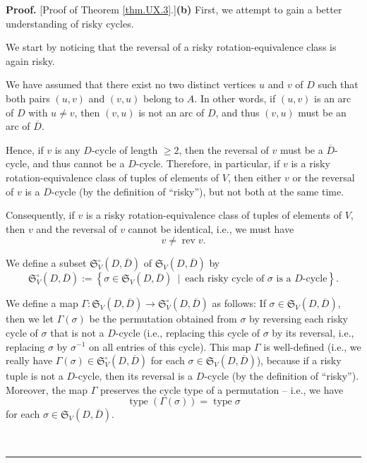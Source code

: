 \documentclass[numbers=enddot,12pt,final,onecolumn,notitlepage]{scrartcl}%
\numberwithin{exer}{section}
\theoremstyle{definition}
\newenvironment{proof}[1][Proof]{\noindent\textbf{#1.} }{\ \rule{0.5em}{0.5em}}
\begin{document}
\begin{proof}
[Proof of Theorem \ref{thm.UX.3}.]\textbf{(b)} First, we attempt to gain a
better understanding of risky cycles.

We start by noticing that the reversal of a risky rotation-equivalence class
is again risky.

We have assumed that there exist no two distinct vertices $u$ and $v$ of $D$
such that both pairs $\left(  u,v\right)  $ and $\left(  v,u\right)  $ belong
to $A$. In other words, if $\left(  u,v\right)  $ is an arc of $D$ with $u\neq
v$, then $\left(  v,u\right)  $ is not an arc of $D$, and thus $\left(
v,u\right)  $ must be an arc of $\overline{D}$.

Hence, if $v$ is any $D$-cycle of length $\geq2$, then the reversal of $v$
must be a $\overline{D}$-cycle, and thus cannot be a $D$-cycle. Therefore, in
particular, if $v$ is a risky rotation-equivalence class of tuples of elements
of $V$, then either $v$ or the reversal of $v$ is a $D$-cycle (by the
definition of \textquotedblleft risky\textquotedblright), but not both at the
same time.

Consequently, if $v$ is a risky rotation-equivalence class of tuples of
elements of $V$, then $v$ and the reversal of $v$ cannot be identical, i.e.,
we must have%
\begin{equation}
v\neq\operatorname*{rev}v. \label{pf.thm.UX.3.not-rev}%
\end{equation}


We define a subset $\mathfrak{S}_{V}^{\circ}\left(  D,\overline{D}\right)  $
of $\mathfrak{S}_{V}\left(  D,\overline{D}\right)  $ by%
\[
\mathfrak{S}_{V}^{\circ}\left(  D,\overline{D}\right)  :=\left\{  \sigma
\in\mathfrak{S}_{V}\left(  D,\overline{D}\right)  \ \mid\ \text{each risky
cycle of }\sigma\text{ is a }D\text{-cycle}\right\}  .
\]


We define a map $\Gamma:\mathfrak{S}_{V}\left(  D,\overline{D}\right)
\rightarrow\mathfrak{S}_{V}^{\circ}\left(  D,\overline{D}\right)  $ as
follows: If $\sigma\in\mathfrak{S}_{V}\left(  D,\overline{D}\right)  $, then
we let $\Gamma\left(  \sigma\right)  $ be the permutation obtained from
$\sigma$ by reversing each risky cycle of $\sigma$ that is not a $D$-cycle
(i.e., replacing this cycle of $\sigma$ by its reversal, i.e., replacing
$\sigma$ by $\sigma^{-1}$ on all entries of this cycle). This map $\Gamma$ is
well-defined (i.e., we really have $\Gamma\left(  \sigma\right)
\in\mathfrak{S}_{V}^{\circ}\left(  D,\overline{D}\right)  $ for each
$\sigma\in\mathfrak{S}_{V}\left(  D,\overline{D}\right)  $), because if a
risky tuple is not a $D$-cycle, then its reversal is a $D$-cycle (by the
definition of \textquotedblleft risky\textquotedblright). Moreover, the map
$\Gamma$ preserves the cycle type of a permutation -- i.e., we have%
\begin{equation}
\operatorname*{type}\left(  \Gamma\left(  \sigma\right)  \right)
=\operatorname*{type}\sigma\label{pf.cor.UX.p-pos.types}%
\end{equation}
for each $\sigma\in\mathfrak{S}_{V}\left(  D,\overline{D}\right)  $.


\end{proof}
\end{document}
